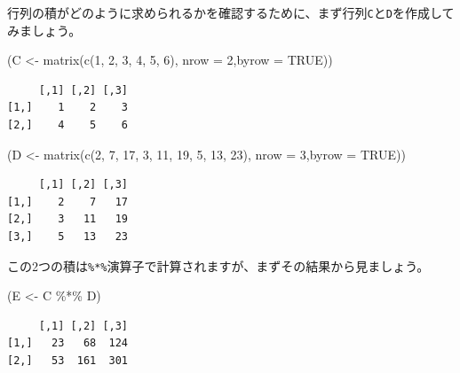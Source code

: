 \documentclass[
  a4paper,
  pandoc,
  ja=standard,
  jafont=haranoaji]{bxjsbook}
\newenvironment{Shaded}{\begin{snugshade}}{\end{snugshade}}
\newcommand{\AttributeTok}[1]{\textcolor[rgb]{0.00,0.48,0.65}{#1}}
\newcommand{\ConstantTok}[1]{\textcolor[rgb]{0.56,0.35,0.01}{#1}}
\newcommand{\DecValTok}[1]{\textcolor[rgb]{0.68,0.00,0.00}{#1}}
\newcommand{\FunctionTok}[1]{\textcolor[rgb]{0.28,0.35,0.67}{#1}}
\newcommand{\NormalTok}[1]{\textcolor[rgb]{0.00,0.48,0.65}{#1}}
\newcommand{\OtherTok}[1]{\textcolor[rgb]{0.00,0.48,0.65}{#1}}
\newcommand{\SpecialCharTok}[1]{\textcolor[rgb]{0.37,0.37,0.37}{#1}}
\begin{document}
行列の積がどのように求められるかを確認するために、まず行列\texttt{C}と\texttt{D}を作成してみましょう。

\begin{Shaded}
\begin{Highlighting}[numbers=left,,]
\NormalTok{(C }\OtherTok{\textless{}{-}} \FunctionTok{matrix}\NormalTok{(}\FunctionTok{c}\NormalTok{(}\DecValTok{1}\NormalTok{, }\DecValTok{2}\NormalTok{, }\DecValTok{3}\NormalTok{, }\DecValTok{4}\NormalTok{, }\DecValTok{5}\NormalTok{, }\DecValTok{6}\NormalTok{), }\AttributeTok{nrow =} \DecValTok{2}\NormalTok{,}\AttributeTok{byrow =} \ConstantTok{TRUE}\NormalTok{))}
\end{Highlighting}
\end{Shaded}

\begin{verbatim}
     [,1] [,2] [,3]
[1,]    1    2    3
[2,]    4    5    6
\end{verbatim}

\begin{Shaded}
\begin{Highlighting}[numbers=left,,]
\NormalTok{(D }\OtherTok{\textless{}{-}} \FunctionTok{matrix}\NormalTok{(}\FunctionTok{c}\NormalTok{(}\DecValTok{2}\NormalTok{, }\DecValTok{7}\NormalTok{, }\DecValTok{17}\NormalTok{, }\DecValTok{3}\NormalTok{, }\DecValTok{11}\NormalTok{, }\DecValTok{19}\NormalTok{, }\DecValTok{5}\NormalTok{, }\DecValTok{13}\NormalTok{, }\DecValTok{23}\NormalTok{), }\AttributeTok{nrow =} \DecValTok{3}\NormalTok{,}\AttributeTok{byrow =} \ConstantTok{TRUE}\NormalTok{))}
\end{Highlighting}
\end{Shaded}

\begin{verbatim}
     [,1] [,2] [,3]
[1,]    2    7   17
[2,]    3   11   19
[3,]    5   13   23
\end{verbatim}

この2つの積は\texttt{\%*\%}演算子で計算されますが、まずその結果から見ましょう。

\begin{Shaded}
\begin{Highlighting}[numbers=left,,]
\NormalTok{(E }\OtherTok{\textless{}{-}}\NormalTok{ C }\SpecialCharTok{\%*\%}\NormalTok{ D)}
\end{Highlighting}
\end{Shaded}

\begin{verbatim}
     [,1] [,2] [,3]
[1,]   23   68  124
[2,]   53  161  301
\end{verbatim}
\end{document}
